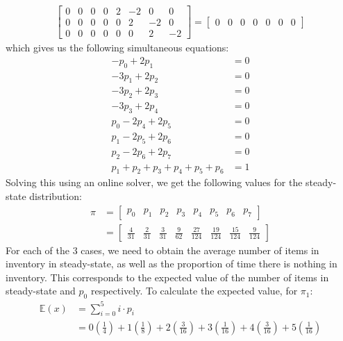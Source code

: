 \documentclass[12pt]{article}
\begin{document}
\begin{align*}
\begin{bmatrix}
        0 & 0 & 0 & 0 & 2 & -2 & 0 & 0 \\ 
        0 & 0 & 0 & 0 & 0 & 2 & -2 & 0 \\ 
        0 & 0 & 0 & 0 & 0 & 0 & 2 & -2
    \end{bmatrix} = \begin{bmatrix}
        0 & 0 & 0 & 0 & 0 & 0 & 0
    \end{bmatrix}
\end{align*} which gives us the following simultaneous equations: \begin{align*}
    -p_{0} + 2 p_{1} &= 0 \\ 
    -3p_{1} + 2 p_{2} &= 0 \\ 
    -3p_{2} + 2 p_{3} &= 0 \\ 
    -3p_{3} + 2 p_{4} &= 0 \\ 
    p_{0}-2p_{4} + 2 p_{5} &= 0 \\ 
    p_{1}-2p_{5} + 2 p_{6} &= 0 \\ 
    p_{2}-2p_{6} + 2 p_{7} &= 0 \\ 
    p_{1}+p_{2}+p_{3}+p_{4}+p_{5} +p_6&= 1 
\end{align*} Solving this using an online solver, we get the following values for the steady-state distribution: \begin{align*}
    \pi &= \begin{bmatrix}
        p_{0} & p_{1} & p_{2} & p_{3} & p_{4} & p_{5} & p_{6}& p_{7}
    \end{bmatrix} \\ 
    &= \begin{bmatrix}
        \displaystyle\frac{4}{31} & \displaystyle\frac{2}{31} & \displaystyle\frac{3}{31} & \displaystyle\frac{9}{62} & \displaystyle\frac{27}{124} & \displaystyle\frac{19}{124} & \displaystyle\frac{15}{124} & \displaystyle\frac{9}{124}
    \end{bmatrix}
\end{align*} For each of the 3 cases, we need to obtain the average number of items in inventory in steady-state, as well as the proportion of time there is nothing in inventory. This corresponds to the expected value of the number of items in steady-state and $p_{0}$ respectively. To calculate the expected value, for $\pi_1$: \begin{align*}
    \mathbb{E}(x) &= \sum_{i=0}^{5} i\cdot p_i \\ 
    &= 0\left( \frac{1}{4} \right) + 1\left( \frac{1}{8} \right) + 2\left( \frac{3}{16} \right) + 3\left( \frac{1}{16} \right) + 4\left( \frac{3}{16} \right) + 5\left( \frac{1}{16} \right) \\ 

\end{align*}
\end{document}
